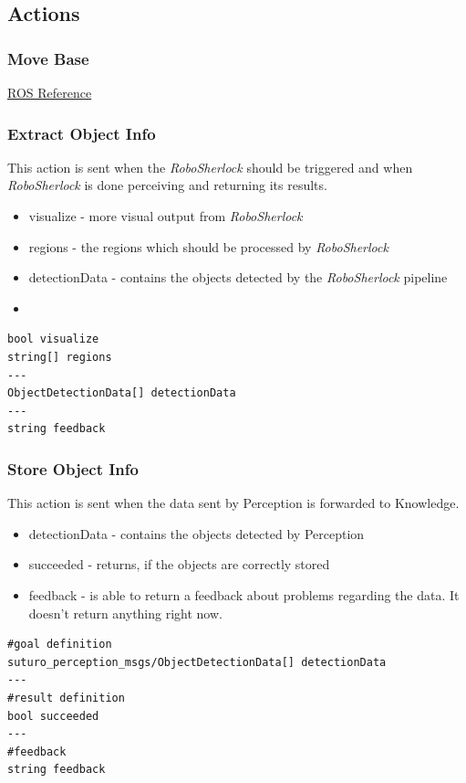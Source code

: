 \documentclass[main.tex]{subfiles}
\begin{document}
				\subsection{Actions}
				\label{actions}
					\subsubsection{Move Base}
					\label{msg_move_base}
						\href{http://wiki.ros.org/move_base_msgs/MoveBaseAction}{ROS Reference}
					\subsubsection{Extract Object Info}
					\label{msg_extract_object_info}
						This action is sent when the \textit{RoboSherlock} should be triggered and when \textit{RoboSherlock} is done perceiving and returning its results.
					\begin{itemize}
						\item visualize - more visual output from \textit{RoboSherlock}
						\item regions - the regions which should be processed by \textit{RoboSherlock}
						\item detectionData - contains the objects detected by the \textit{RoboSherlock} pipeline
						\item
					\end{itemize}
					\begin{lstlisting}
bool visualize
string[] regions
---
ObjectDetectionData[] detectionData
---
string feedback
\end{lstlisting}
					\subsubsection{Store Object Info}
					\label{msg_store_object_info}
						This action is sent when the data sent by Perception is forwarded to Knowledge.
						\begin{itemize}
						\item detectionData - contains the objects detected by Perception
						\item succeeded - returns, if the objects are correctly stored
						\item feedback - is able to return a feedback about problems regarding the data. It doesn't return anything right now.
						\end{itemize}
						\begin{lstlisting}
#goal definition
suturo_perception_msgs/ObjectDetectionData[] detectionData
---
#result definition
bool succeeded
---
#feedback
string feedback
\end{lstlisting}
\end{document}
